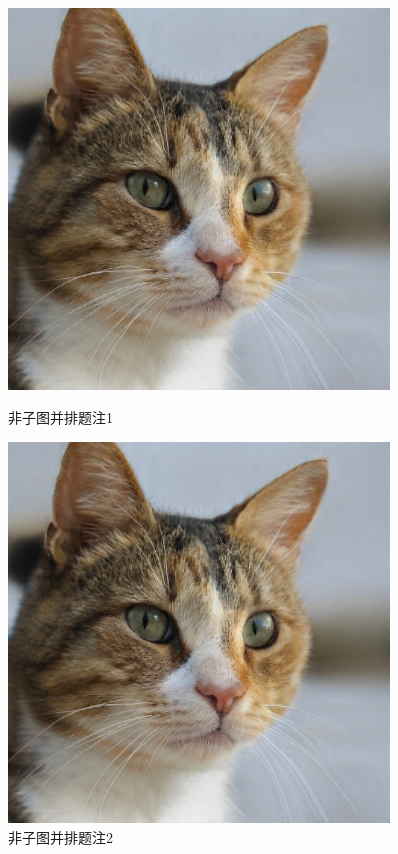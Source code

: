 \documentclass[12pt,a4paper,UTF8]{article}
\begin{document}
    \begin{figure}[!htbp]
        \centering
        \begin{minipage}[b]{0.45\linewidth}
            \centering
            \includegraphics[width=0.9\textwidth]{example}
            \caption{非子图并排题注1}
             
        \end{minipage}%
        \begin{minipage}[b]{0.45\linewidth}
            \centering
            \includegraphics[width=0.9\textwidth]{example}
            \caption{非子图并排题注2}
             
        \end{minipage}
    \end{figure}
\end{document}
